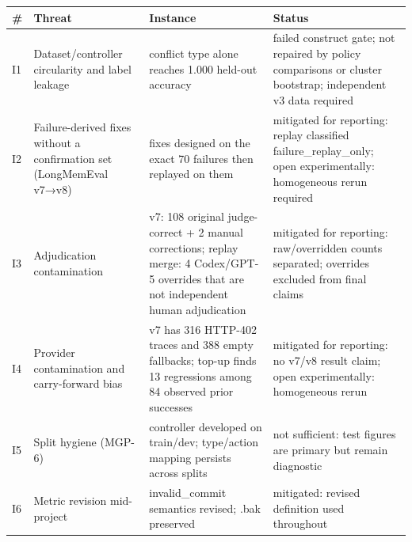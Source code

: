 {\def\LTcaptype{none} %
\begin{longtable}[]{@{}
  >{\raggedright\arraybackslash}p{}
  >{\raggedright\arraybackslash}p{}
  >{\raggedright\arraybackslash}p{}
  >{\raggedright\arraybackslash}p{}@{}}
\toprule\noalign{}
\begin{minipage}[b]{\linewidth}\raggedright
\textbf{\#}
\end{minipage} & \begin{minipage}[b]{\linewidth}\centering
\textbf{Threat}
\end{minipage} & \begin{minipage}[b]{\linewidth}\centering
\textbf{Instance}
\end{minipage} & \begin{minipage}[b]{\linewidth}\centering
\textbf{Status}
\end{minipage} \\
\midrule\noalign{}
\endhead
\bottomrule\noalign{}
\endlastfoot
I1 & Dataset/controller circularity and label leakage & conflict type
alone reaches 1.000 held-out accuracy & failed construct gate; not
repaired by policy comparisons or cluster bootstrap; independent v3 data
required \\
I2 & Failure-derived fixes without a confirmation set (LongMemEval
v7→v8) & fixes designed on the exact 70 failures then replayed on them &
mitigated for reporting: replay classified failure\_replay\_only; open
experimentally: homogeneous rerun required \\
I3 & Adjudication contamination & v7: 108 original judge-correct + 2
manual corrections; replay merge: 4 Codex/GPT-5 overrides that are not
independent human adjudication & mitigated for reporting: raw/overridden
counts separated; overrides excluded from final claims \\
I4 & Provider contamination and carry-forward bias & v7 has 316 HTTP-402
traces and 388 empty fallbacks; top-up finds 13 regressions among 84
observed prior successes & mitigated for reporting: no v7/v8 result
claim; open experimentally: homogeneous rerun \\
I5 & Split hygiene (MGP-6) & controller developed on train/dev;
type/action mapping persists across splits & not sufficient: test
figures are primary but remain diagnostic \\
I6 & Metric revision mid-project & invalid\_commit semantics revised;
.bak preserved & mitigated: revised definition used throughout \\
\end{longtable}
}

